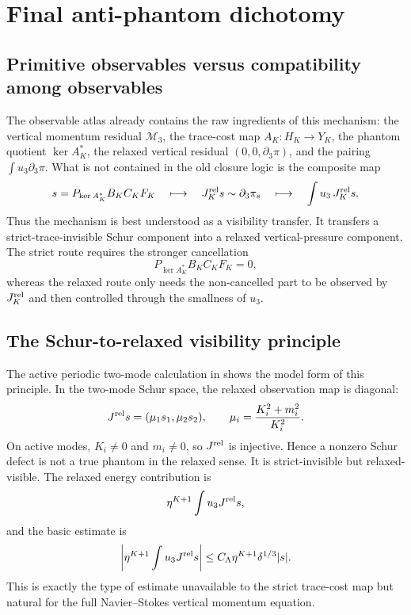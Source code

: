 \documentclass[11pt]{article}
\numberwithin{equation}{section}
\newcommand{\calM}{\mathcal M}
\begin{document}
\section{Final anti-phantom dichotomy}

\subsection{Primitive observables versus compatibility among observables}

The observable atlas already contains the raw ingredients of this mechanism: the vertical momentum residual \(\calM_3\), the trace-cost map \(A_K:H_K\to Y_K\), the phantom quotient \(\ker A_K^*\), the relaxed vertical residual \((0,0,\partial_3\pi)\), and the pairing \(\int u_3\partial_3\pi\).  What is not contained in the old closure logic is the composite map
\begin{equation}\label{eq:composite-Schur-map}
        s
        =P_{\ker A_K^*}B_KC_KF_K
        \quad\longmapsto\quad
        J_K^{\rm rel}s\sim \partial_3\pi_s
        \quad\longmapsto\quad
        \int u_3\,J_K^{\rm rel}s.
\end{equation}
Thus the mechanism is best understood as a visibility transfer.  It transfers a strict-trace-invisible Schur component into a relaxed vertical-pressure component.  The strict route requires the stronger cancellation
\begin{equation}\label{eq:strict-Schur-cancellation-summary}
        P_{\ker A_K^*}B_KC_KF_K=0,
\end{equation}
whereas the relaxed route only needs the non-cancelled part to be observed by \(J_K^{\rm rel}\) and then controlled through the smallness of \(u_3\).

\subsection{The Schur-to-relaxed visibility principle}

The active periodic two-mode calculation in  shows the model form of this principle.  In the two-mode Schur space, the relaxed observation map is diagonal:
\[
        J^{\rm rel}s=(\mu_1s_1,\mu_2s_2),
        \qquad
        \mu_i=\frac{K_i^2+m_i^2}{K_i^2}.
\]
On active modes, \(K_i\ne0\) and \(m_i\ne0\), so \(J^{\rm rel}\) is injective.  Hence a nonzero Schur defect is not a true phantom in the relaxed sense.  It is strict-invisible but relaxed-visible.  The relaxed energy contribution is
\[
        \eta^{K+1}\int u_3J^{\rm rel}s,
\]
and the basic estimate is
\begin{equation}\label{eq:relaxed-visible-bound-summary}
        \left|\eta^{K+1}\int u_3J^{\rm rel}s\right|
        \le
        C_\Lambda\eta^{K+1}\delta^{1/3}|s|.
\end{equation}
This is exactly the type of estimate unavailable to the strict trace-cost map but natural for the full Navier--Stokes vertical momentum equation.
\end{document}
